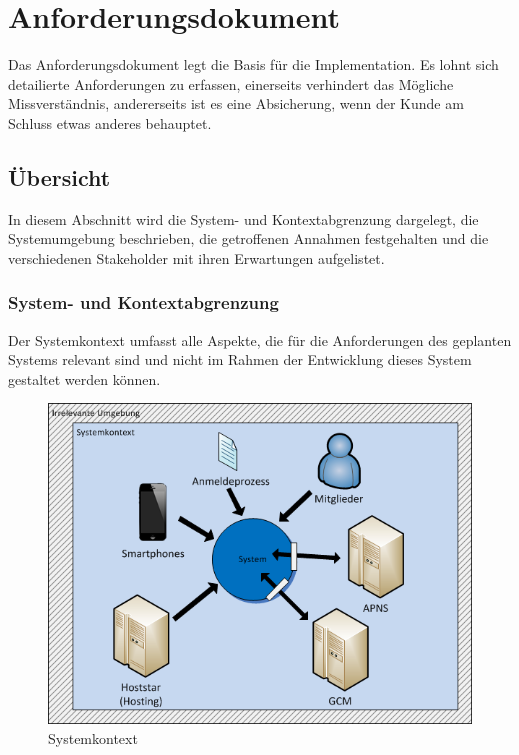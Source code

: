 %
%

\chapter{Anforderungsdokument}\label{chap.anforderungsdokument}

Das Anforderungsdokument legt die Basis für die Implementation. Es lohnt sich detailierte Anforderungen zu erfassen, einerseits verhindert das Mögliche Missverständnis, andererseits ist es eine Absicherung, wenn der Kunde am Schluss etwas anderes behauptet.

\section{Übersicht}\label{anf_uebersicht}

In diesem Abschnitt  wird die System- und Kontextabgrenzung dargelegt, die Systemumgebung beschrieben, die getroffenen Annahmen festgehalten und die verschiedenen Stakeholder mit ihren Erwartungen aufgelistet.

\subsection{System- und Kontextabgrenzung}\label{systemabgrenzung}
Der Systemkontext umfasst alle Aspekte, die für die Anforderungen des geplanten Systems relevant sind und nicht im Rahmen der Entwicklung dieses System gestaltet werden können.\cite{req_eng_book} 
\begin{figure}[h]
\includegraphics{images/visio/systemkontext.png}
\caption{Systemkontext}
\label{fig:systemkontext}
\end{figure}

